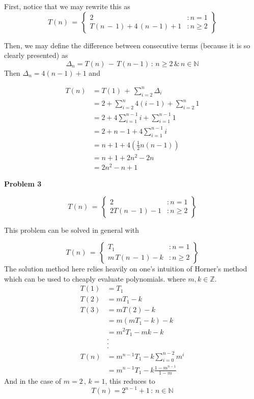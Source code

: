 \documentclass{article}
\begin{document}
    First, notice that we may rewrite this as
    $$
      T(n) \, = \, \left\{
      \begin{array}{lr}
        2 &: n = 1 \\
        T(n\,-\,1) +4\,(n\,-1) + 1 &: n \geq 2
      \end{array}
      \right\}
    $$

    Then, we may define the difference between consecutive terms (because it is so clearly presented) as $$ \Delta_n = T(n) \, - \, T(n -1)\,:\, n \geq 2\, \& \, n \in \mathbb{N}$$
    Then $ \Delta_n = 4(n-1) + 1$ and

    \begin{equation}
      \begin{split}
        T(n) & = T(1) \, + \,\sum_{i=2}^{n} \Delta_i  \\
        & = 2 + \sum_{i=2}^{n}4(i-1) + \sum_{i=2}^{n}1 \\
        & = 2 + 4\sum_{i=1}^{n-1}i + \sum_{i=1}^{n-1}1 \\
        & = 2 + n -1 + 4 \sum_{i=1}^{n-1}i \\
        & = n + 1 + 4(\frac{1}{2}n(n-1)) \\
        & = n + 1 + 2n^2 -2n \\
        & = 2n^2 - n + 1
      \end{split}
    \end{equation}

  \noindent \textbf{Problem 3}

  $$
    T(n) \, = \, \left\{
    \begin{array}{lr}
      2 &: n = 1 \\
      2T(n\,-\,1) - 1 &: n \geq 2
    \end{array}
    \right\}
  $$

  This problem can be solved in general with

  $$
    T(n) \, = \, \left\{
    \begin{array}{lr}
      T_1 &: n = 1 \\
      m \,T(n\,-\,1) - k &: n \geq 2
    \end{array}
    \right\}
  $$
  The solution method here relies heavily on one's intuition of Horner's method
  which can be used to cheaply evaluate polynomials.
  where $ m,k \in \mathbb{Z}$.
  \begin{equation}
    \begin{split}
      T(1) & = T_1 \\
      T(2) & = m T_1 - k \\
      T(3) & = m T(2) - k \\
      & = m (m T_1 - k) - k \\
      & = m^2 T_1 - m k - k \\
      & . \\
      & . \\
      & . \\
      T(n) & = m^{n-1} T_1 - k \sum_{i=0}^{n-2}m^i \\
      & = m^{n-1} T_1 - k \frac{1 - m^{n-1}}{1 - m}
    \end{split}
  \end{equation}
  And in the case of $ m = 2 \,,\, k =1$, this reduces to $$ T(n) = 2^{n-1} + 1\,:\, n \in \mathbb{N}$$
\end{document}

